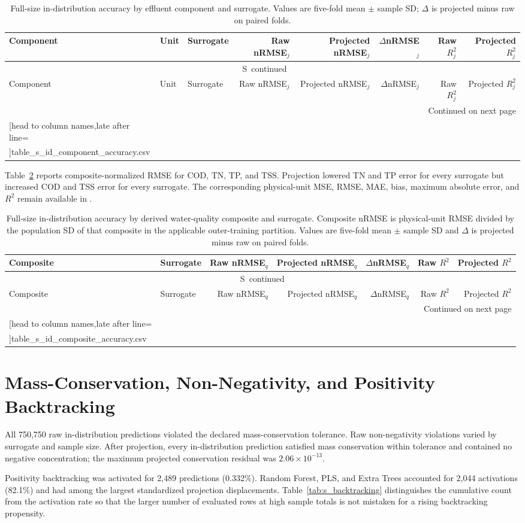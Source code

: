 \documentclass[a4paper,10pt]{article}
\newcommand{\csvrowsseven}[1]{%
  \csvreader[head to column names,late after line=\\]{#1}{}{\colA & \colB & \colC & \colD & \colE & \colF & \colG}}
\newcommand{\csvrowseight}[1]{%
  \csvreader[head to column names,late after line=\\]{#1}{}{\colA & \colB & \colC & \colD & \colE & \colF & \colG & \colH}}
\newcommand{\csvlongtable}[7]{%
  \begin{longtable}{#1}
  \caption{#2}\label{#3}\\
  \toprule
  #5 \\
  \midrule
  \endfirsthead
  \multicolumn{#4}{c}{\tablename\ \thetable\ continued}\\
  \toprule
  #5 \\
  \midrule
  \endhead
  \midrule\multicolumn{#4}{r}{Continued on next page}\\
  \endfoot
  \bottomrule
  \endlastfoot
  #7{#6}
  \end{longtable}%
}
\renewcommand{\thetable}{S\arabic{table}}
\begin{document}
\begingroup
\scriptsize
\setlength{\tabcolsep}{2.2pt}
\csvlongtable
  {llp{3.1cm}rrrrr}
  {Full-size in-distribution accuracy by effluent component and surrogate. Values are five-fold mean $\pm$ sample SD; $\Delta$ is projected minus raw on paired folds.}
  {tab:s_id_component_accuracy}
  {8}
  {Component & Unit & Surrogate & Raw nRMSE$_j$ & Projected nRMSE$_j$ & $\Delta$nRMSE$_j$ & Raw $R^2_j$ & Projected $R^2_j$}
  {table_s_id_component_accuracy.csv}
  {\csvrowseight}
\endgroup

\clearpage
Table~\ref{tab:s_id_composite_accuracy} reports composite-normalized RMSE for COD, TN, TP, and TSS. Projection lowered TN and TP error for every surrogate but increased COD and TSS error for every surrogate. The corresponding physical-unit MSE, RMSE, MAE, bias, maximum absolute error, and $R^2$ remain available in .

\begingroup
\scriptsize
\setlength{\tabcolsep}{3pt}
\csvlongtable
  {lp{3.1cm}rrrrr}
  {Full-size in-distribution accuracy by derived water-quality composite and surrogate. Composite nRMSE is physical-unit RMSE divided by the population SD of that composite in the applicable outer-training partition. Values are five-fold mean $\pm$ sample SD and $\Delta$ is projected minus raw on paired folds.}
  {tab:s_id_composite_accuracy}
  {7}
  {Composite & Surrogate & Raw nRMSE$_q$ & Projected nRMSE$_q$ & $\Delta$nRMSE$_q$ & Raw $R^2$ & Projected $R^2$}
  {table_s_id_composite_accuracy.csv}
  {\csvrowsseven}
\endgroup

\section{Mass-Conservation, Non-Negativity, and Positivity Backtracking}

All 750,750 raw in-distribution predictions violated the declared mass-conservation tolerance. Raw non-negativity violations varied by surrogate and sample size. After projection, every in-distribution prediction satisfied mass conservation within tolerance and contained no negative concentration; the maximum projected conservation residual was $2.06\times10^{-13}$.

Positivity backtracking was activated for 2,489 predictions (0.332\%). Random Forest, PLS, and Extra Trees accounted for 2,044 activations (82.1\%) and had among the largest standardized projection displacements. Table~\ref{tab:s_backtracking} distinguishes the cumulative count from the activation rate so that the larger number of evaluated rows at high sample totals is not mistaken for a rising backtracking propensity.
\end{document}
